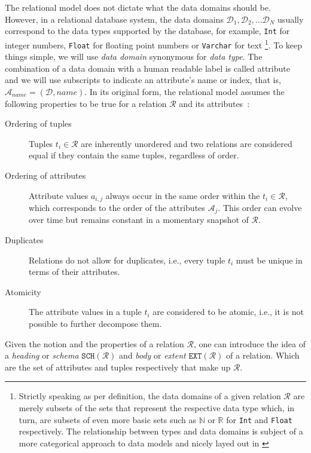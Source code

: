 The relational model does not dictate what the data domains should be. However, in a relational database system, the data domains $\mathcal{D}_1, \mathcal{D}_2, ... \mathcal{D}_N$ usually correspond to the data types supported by the database, for example, \lstinline{Int} for integer numbers, \lstinline{Float} for floating point numbers or \lstinline{Varchar} for text \footnote{Strictly speaking as per definition, the data domains of a given relation $\mathcal{R}$ are merely subsets of the sets that represent the respective data type which, in turn, are subsets of even more basic sets such as $\mathbb{N}$ or $\mathbb{R}$ for \lstinline{Int} and \lstinline{Float} respectively. The relationship between types and data domains is subject of a more categorical approach to data models and nicely layed out in \cite{Spivak:2009Simplicial}}. To keep things simple, we will use \emph{data domain} synonymous for \emph{data type}. The combination of a data domain with a human readable label is called attribute and we will use subscripts to indicate an attribute's name or index, that is, $\mathcal{A}_{name} = (\mathcal{D}, name)$. In its original form, the relational model assumes the following properties to be true for a relation $\mathcal{R}$ and its attributes~\cite{Codd:1970Relational}:

\begin{description}
    \item[Ordering of tuples] Tuples $t_i \in \mathcal{R}$ are inherently unordered and two relations are considered equal if they contain the same tuples, regardless of order.
    \item[Ordering of attributes] Attribute values $a_{i,j}$ always occur in the same order within the $t_i \in \mathcal{R}$, which corresponds to the order of the attributes $\mathcal{A}_j$. This order can evolve over time but remains constant in a momentary snapshot of $\mathcal{R}$.
    \item[Duplicates] Relations do not allow for duplicates, i.e., every tuple $t_i$ must be unique in terms of their attributes.
    \item[Atomicity] The attribute values in a tuple $t_i$ are considered to be atomic, i.e., it is not possible to further decompose them.
\end{description}

Given the notion and the properties of a relation $\mathcal{R}$, one can introduce the idea of a \emph{heading} or \emph{schema} $\mathtt{SCH}(\mathcal{R})$ and \emph{body} or \emph{extent} $\mathtt{EXT}(\mathcal{R})$ of a relation. Which are the set of attributes and tuples respectively that make up $\mathcal{R}$.

